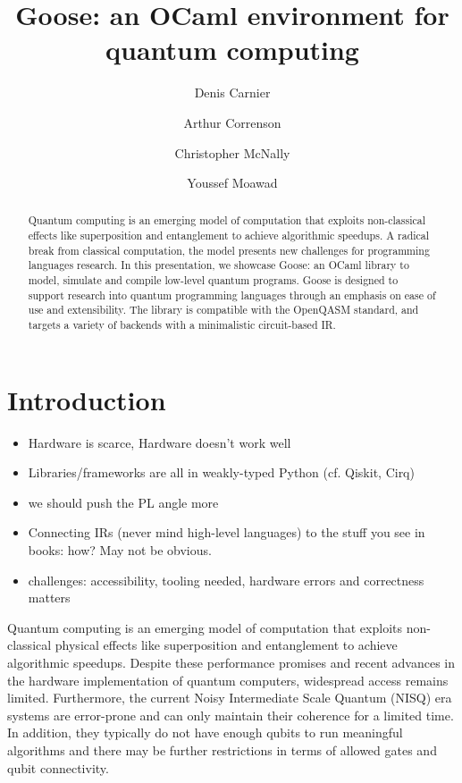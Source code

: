 \documentclass[a4paper]{easychair}
\title{Goose: an OCaml environment for quantum computing}
\author{
  Denis Carnier\inst{1}
  \and
  Arthur Correnson\inst{2}
  \and
  Christopher McNally\inst{3}
  \and
  Youssef Moawad\inst{4}
}
\institute{
  imec-DistriNet, KU Leuven
\and
  Ecole Normale Sup\'erieure de Rennes
\and
  Massachusetts Institute of Technology
\and
  University of Glasgow
}
\begin{document}
\maketitle

\begin{abstract}
Quantum computing is an emerging model of computation that exploits non-classical effects like superposition and entanglement to achieve algorithmic speedups. A radical break from classical computation, the model presents new challenges for programming languages research. In this presentation, we showcase Goose: an OCaml library to model, simulate and compile low-level quantum programs. Goose is designed to support research into quantum programming languages through an emphasis on ease of use and extensibility. The library is compatible with the OpenQASM standard, and targets a variety of backends with a minimalistic circuit-based IR.
\end{abstract}

\section{Introduction}

\begin{itemize}
\item Hardware is scarce, Hardware doesn't work well
\item Libraries/frameworks are all in weakly-typed Python (cf. Qiskit, Cirq)
\item we should push the PL angle more
\item Connecting IRs (never mind high-level languages) to the stuff you see in books: how? May not be obvious.
\item challenges: accessibility, tooling needed, hardware errors and correctness matters
\end{itemize}

\newcommand{\nisq}[0]{NISQ}

Quantum computing is an emerging model of computation that exploits non-classical physical effects like superposition and entanglement to achieve algorithmic speedups. Despite these performance promises and recent advances in the hardware implementation of quantum computers, widespread access remains limited. Furthermore, the current Noisy Intermediate Scale Quantum (\nisq) era systems are error-prone and can only maintain their coherence for a limited time. In addition, they typically do not have enough qubits to run meaningful algorithms and there may be further restrictions in terms of allowed gates and qubit connectivity. 
\end{document}
